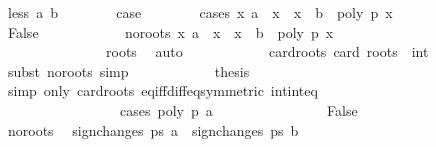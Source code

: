 \begin{isabellebody}
\ {\isacharparenleft}less\ a\ b{\isacharparenright}\isanewline
\ \ \ \ \ \ \isamarkupfalse%
\ {\isacharquery}case\isanewline
\ \ \ \ \ \ \isamarkupfalse%
\ {\isacharparenleft}cases\ {\isachardoublequoteopen}{\isasymexists}x{\isachardot}\ a\ {\isacharless}\ x\ {\isasymand}\ x\ {\isasymle}\ b\ {\isasymand}\ poly\ p\ x\ {\isacharequal}\ {}{\isachardoublequoteclose}{\isacharparenright}\isanewline
\ \ \ \ \ \ \ \ \isamarkupfalse%
\ False\isanewline
\ \ \ \ \ \ \ \ \ \ \isamarkupfalse%
\ no{\isacharunderscore}roots{\isacharcolon}\ {\isachardoublequoteopen}{\isacharbraceleft}x{\isachardot}\ a\ {\isacharless}\ x\ {\isasymand}\ x\ {\isasymle}\ b\ {\isasymand}\ poly\ p\ x\ {\isacharequal}\ {}{\isacharbraceright}\ {\isacharequal}\ {\isacharbraceleft}{\isacharbraceright}{\isachardoublequoteclose}\ \isanewline
\ \ \ \ \ \ \ \ \ \ \ \ \ \ {\isacharparenleft}\ {\isachardoublequoteopen}{\isacharquery}roots{\isacharequal}{\isacharunderscore}{\isachardoublequoteclose}{\isacharparenright}\ \isamarkupfalse%
\ auto\isanewline
\ \ \ \ \ \ \ \ \ \ \isamarkupfalse%
\ card{\isacharunderscore}roots{\isacharcolon}\ {\isachardoublequoteopen}card\ {\isacharquery}roots\ {\isacharequal}\ {\isacharparenleft}{}{\isacharcolon}{\isacharcolon}int{\isacharparenright}{\isachardoublequoteclose}\ \isamarkupfalse%
\ {\isacharparenleft}subst\ no{\isacharunderscore}roots{\isacharcomma}\ simp{\isacharparenright}\isanewline
\ \ \ \ \ \ \ \ \ \ \isamarkupfalse%
\ {\isacharquery}thesis\isanewline
\ \ \ \ \ \ \ \ \ \ \isamarkupfalse%
\ {\isacharparenleft}simp\ only{\isacharcolon}\ card{\isacharunderscore}roots\ eq{\isacharunderscore}iff{\isacharunderscore}diff{\isacharunderscore}eq{\isacharunderscore}{}{\isacharbrackleft}symmetric{\isacharbrackright}\ int{\isacharunderscore}int{\isacharunderscore}eq{\isacharcomma}\ \isanewline
\ \ \ \ \ \ \ \ \ \ \ \ \ \ \ \ \ cases\ {\isachardoublequoteopen}poly\ p\ a\ {\isacharequal}\ {}{\isachardoublequoteclose}{\isacharparenright}\isanewline
\ \ \ \ \ \ \ \ \ \ \ \ \isamarkupfalse%
\ False\isanewline
\ \ \ \ \ \ \ \ \ \ \ \ \ \ \isamarkupfalse%
\ no{\isacharunderscore}roots\ \isamarkupfalse%
\ {\isachardoublequoteopen}sign{\isacharunderscore}changes\ ps\ a\ {\isacharequal}\ sign{\isacharunderscore}changes\ ps\ b{\isachardoublequoteclose}\isanewline
\ \ \ \ \ \ \ \ \ \ \ \ \ \ \ \ \ \ \isamarkupfalse%

\end{isabellebody}
